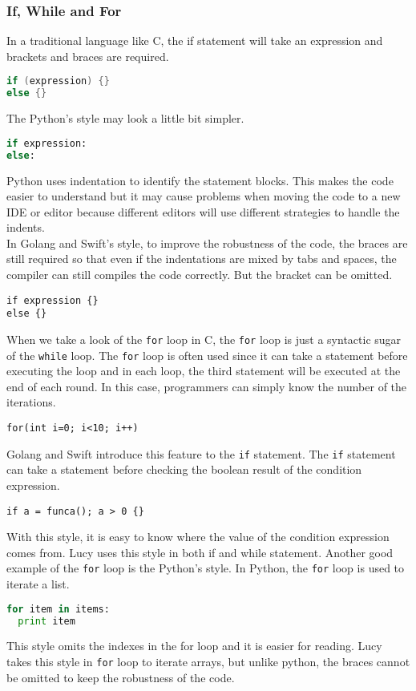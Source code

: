 \subsubsection{If, While and For}
In a traditional language like C, the if statement will take an expression and brackets and braces are required.
\begin{lstlisting}[language=c]
if (expression) {}
else {}
\end{lstlisting}
The Python's style may look a little bit simpler.
\begin{lstlisting}[language=python]
if expression:
else:
\end{lstlisting}
Python uses indentation to identify the statement blocks. This makes the code easier to understand but it may cause problems when moving the code to a new IDE or editor because different editors will use different strategies to handle the indents. \\
In Golang and Swift's style, to improve the robustness of the code, the braces are still required so that even if the indentations are mixed by tabs and spaces, the compiler can still compiles the code correctly. But the bracket can be omitted.
\begin{lstlisting}
if expression {}
else {}
\end{lstlisting}
When we take a look of the \texttt{for} loop in C, the \texttt{for} loop is just a syntactic sugar of the \texttt{while} loop. The \texttt{for} loop is often used since it can take a statement before executing the loop and in each loop, the third statement will be executed at the end of each round. In this case, programmers can simply know the number of the iterations.
\begin{lstlisting}
for(int i=0; i<10; i++)
\end{lstlisting}
Golang and Swift introduce this feature to the \texttt{if} statement. The \texttt{if} statement can take a statement before checking the boolean result of the condition expression.
\begin{lstlisting}
if a = funca(); a > 0 {}
\end{lstlisting}
With this style, it is easy to know where the value of the condition expression comes from. Lucy uses this style in both if and while statement.
Another good example of the \texttt{for} loop is the Python's style. In Python, the \texttt{for} loop is used to iterate a list.
\begin{lstlisting}[language=python]
for item in items:
  print item
\end{lstlisting}
This style omits the indexes in the for loop and it is easier for reading. Lucy takes this style in \texttt{for} loop to iterate arrays, but unlike python, the braces cannot be omitted to keep the robustness of the code.

